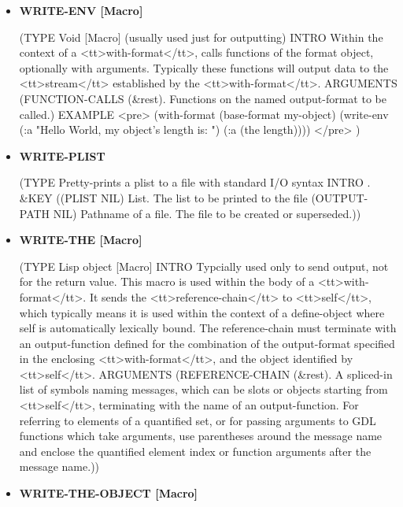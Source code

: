 \documentclass [11pt]{book}
\begin{document}
\begin{itemize}
\item {}
\label{prim:write-env}
\textbf{WRITE-ENV [Macro]}

(TYPE Void [Macro] (usually used just for outputting) INTRO  Within the context of a <tt>with-format</tt>, calls functions of
the format object, optionally with arguments. Typically these functions will output data to the
<tt>stream</tt> established by the <tt>with-format</tt>.
 ARGUMENTS (FUNCTION-CALLS (\&rest). Functions on the named output-format to be called.) EXAMPLE 
<pre>
 (with-format (base-format my-object) (write-env (:a "Hello World, my object's length is: ")
                                                 (:a (the length))))
</pre>
)



\item {}
\label{prim:write-plist}
\textbf{WRITE-PLIST}

(TYPE Pretty-prints a plist to a file with standard I/O syntax INTRO .
 \&KEY ((PLIST NIL) List. The list to be printed to the file (OUTPUT-PATH NIL) Pathname of a file. The file to be created or superseded.))



\item {}
\label{prim:write-the}
\textbf{WRITE-THE [Macro]}

(TYPE Lisp object [Macro] INTRO  Typcially used only to send output, not for the return value. This macro
is used within the body of a <tt>with-format</tt>. It sends the <tt>reference-chain</tt> to
<tt>self</tt>, which typically means it is used within the context of a define-object where
self is automatically lexically bound.
The reference-chain must terminate with an output-function defined for
the combination of the output-format specified in the enclosing
<tt>with-format</tt>, and the object identified by <tt>self</tt>.
 ARGUMENTS (REFERENCE-CHAIN (\&rest). A spliced-in list of symbols naming messages, which can 
be slots or objects starting from <tt>self</tt>, terminating with the name of an output-function.
For referring to elements of a quantified set, or for passing arguments to GDL functions which
take arguments, use parentheses around the message name and enclose the quantified element index
or function arguments after the message name.))



\item {}
\label{prim:write-the-object}
\textbf{WRITE-THE-OBJECT [Macro]}


\end{itemize}
\end{document}
